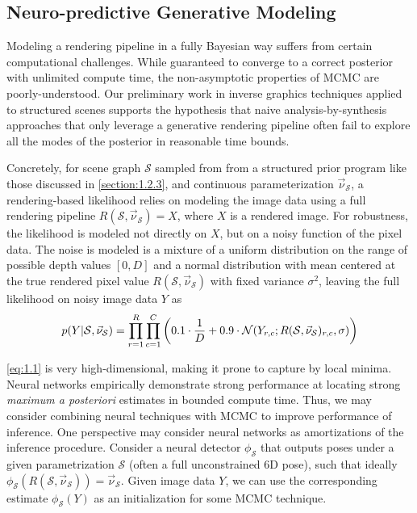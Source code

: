   \subsection{Neuro-predictive Generative Modeling}

    Modeling a rendering pipeline in a fully Bayesian way suffers from certain
    computational challenges. While guaranteed to converge to a correct
    posterior with unlimited compute time, the non-asymptotic properties of
    MCMC are poorly-understood. Our preliminary work in inverse graphics
    techniques applied to structured scenes supports the hypothesis that naive
    analysis-by-synthesis approaches that only leverage a generative rendering
    pipeline often fail to explore all the modes of the posterior in reasonable
    time bounds.

    Concretely, for scene graph $\mathcal{S}$ sampled from from a structured
    prior program like those discussed in \ref{section:1.2.3}, and continuous
    parameterization $\vec{\nu}_\mathcal{S}$, a rendering-based likelihood
    relies on modeling the image data using a full rendering pipeline
    $R(\mathcal{S}, \vec{\nu}_\mathcal{S}) = X$, where $X$ is a rendered image.
    For robustness, the likelihood is modeled not directly on $X$, but on a
    noisy function of the pixel data. The noise is modeled is a mixture of a
    uniform distribution on the range of possible depth values $[0,D]$ and a
    normal distribution with mean centered at the true rendered pixel value
    $R(\mathcal{S}, \vec{\nu}_\mathcal{S})$ with fixed variance $\sigma^2$,
    leaving the full likelihood on noisy image data $Y$ as
    \begin{equation} \label{eq:1.1}
      p(Y | \mathcal{S}, \vec{\nu}_\mathcal{S}) = \prod_{r=1}^R\prod_{c=1}^C \left( 0.1 \cdot \frac{1}{D} + 0.9 \cdot \mathcal{N}(Y_{r,c}; R(\mathcal{S}, \vec{\nu}_\mathcal{S})_{r,c},\sigma) \right)
    \end{equation}

    \ref{eq:1.1} is very high-dimensional, making it prone to capture by local
    minima. Neural networks empirically demonstrate strong performance at
    locating strong \textit{maximum a posteriori} estimates in bounded compute
    time. Thus, we may consider combining neural techniques with MCMC to
    improve performance of inference. One perspective may consider neural
    networks as amortizations of the inference procedure. Consider a neural
    detector $\phi_\mathcal{S}$ that outputs poses under a given
    parametrization $\mathcal{S}$ (often a full unconstrained 6D pose), such
    that ideally $\phi_\mathcal{S}(R(\mathcal{S}, \vec{\nu}_\mathcal{S})) =
    \vec{\nu}_\mathcal{S}$. Given image data $Y$, we can use the corresponding
    estimate $\phi_\mathcal{S}(Y)$ as an initialization for some MCMC
    technique.
    
